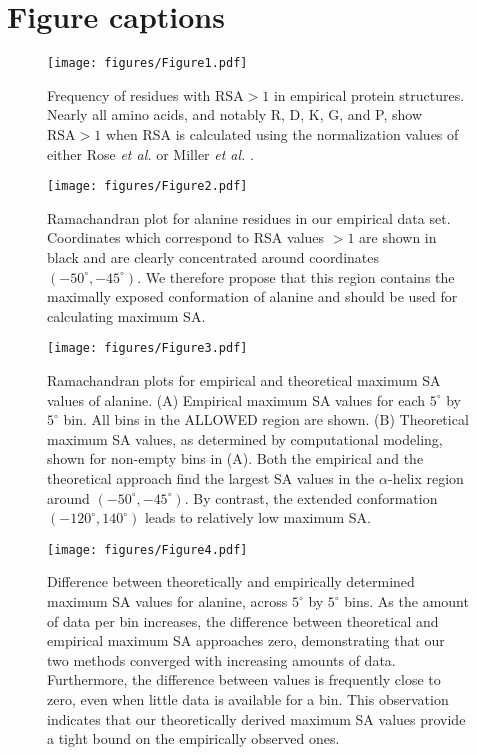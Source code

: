\documentclass[11pt]{article}
\begin{document}



\newpage

\section*{Figure captions}

\begin{figure}[H]
\texttt{[image: figures/Figure1.pdf]}
\caption{\label{fig:BarGraphRSA}Frequency of residues with $\text{RSA}>1$ in empirical protein structures. Nearly all amino acids, and notably R, D, K, G, and P, show $\text{RSA}>1$ 
when RSA is calculated using the normalization values of either Rose \emph{et al.} \cite{Rose1985} or Miller \emph{et al.} \cite{Miller1987}.}
\end{figure}

\begin{figure}[H]
\texttt{[image: figures/Figure2.pdf]}
\caption{\label{fig:RamaAla}Ramachandran plot for alanine residues in our empirical data set. Coordinates which correspond to RSA values $>1$ are shown in black and are clearly concentrated around coordinates $(-50^\circ,-45^\circ)$. We therefore propose that this region contains the maximally exposed conformation of alanine and should be used for calculating maximum SA.}
\end{figure}

\begin{figure}[H]
\texttt{[image: figures/Figure3.pdf]}
\caption{\label{fig:heatrama} Ramachandran plots for empirical and theoretical maximum SA values of alanine. (A) Empirical maximum SA values for each $5^\circ$ by $5^\circ$ bin. All bins in the ALLOWED region are shown. (B) Theoretical maximum SA values, as determined by computational modeling, shown for non-empty bins in (A). Both the empirical and the theoretical approach find the largest SA values in the $\alpha$-helix region around $(-50^\circ,-45^\circ)$. By contrast, the extended conformation $(-120^\circ, 140^\circ)$ leads to relatively low maximum SA.}
\end{figure}


\begin{figure}[H]
\texttt{[image: figures/Figure4.pdf]}
\caption{\label{fig:EvC} Difference between theoretically and empirically determined maximum SA values for alanine, across $5^\circ$ by $5^\circ$ bins. As the amount of data per bin increases, the difference between theoretical and empirical maximum SA approaches zero, demonstrating that our two methods converged with increasing amounts of data. Furthermore, the difference between values is frequently close to zero, even when little data is available for a bin. This observation indicates that our theoretically derived maximum SA values provide a tight bound on the empirically observed ones.}
\end{figure}
\end{document}
